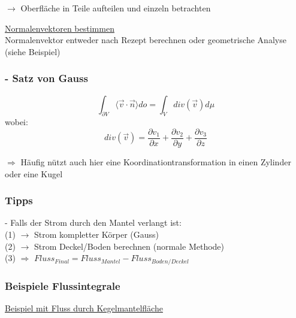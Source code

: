 \documentclass[6pt]{article}
\begin{document}
\begin{multicols*}{3}
		\vspace{3mm} 
		$\longrightarrow$ Oberfl{\"a}che in Teile aufteilen und einzeln betrachten
		\vspace{4mm}
		
		\underline{Normalenvektoren bestimmen} \vspace{1mm} \\
		Normalenvektor entweder nach Rezept berechnen oder geometrische Analyse (siehe Beispiel)		
		
		
			


		\subsubsection*{- Satz von Gauss}
		\[
				\int_{\partial V} \langle \vec{v} \cdot \vec{n} \rangle do = \int_{V} div(\vec{v}) d\mu
		\]
		wobei:
		\[
				div(\vec{v}) = \frac{\partial v_1}{\partial x} + \frac{\partial v_2}{\partial y} + \frac{\partial v_3}{\partial z}
		\]
		
		\vspace{4mm}
		$\Rightarrow$ H{\"a}ufig n{\"u}tzt auch hier eine Koordinationtransformation in einen Zylinder oder eine Kugel
		
		\vspace{5mm} 
		
		
		
		\subsubsection*{Tipps}
		- Falls der Strom durch den Mantel verlangt ist:\\
		(1) $\rightarrow$ Strom kompletter K{\"o}rper (Gauss) \\
		(2) $\rightarrow$ Strom Deckel/Boden berechnen (normale Methode) \\
		(3) $\Rightarrow$ $Fluss_{Final} = Fluss_{Mantel} - Fluss_{Boden/Deckel}$
		
		\vspace{6mm}
		
		\columnbreak
		
		
		\subsubsection*{Beispiele Flussintegrale}
		\underline{Beispiel mit Fluss durch Kegelmantelfl{\"a}che} \vspace{2mm}\\
		

\end{multicols*}
\end{document}
